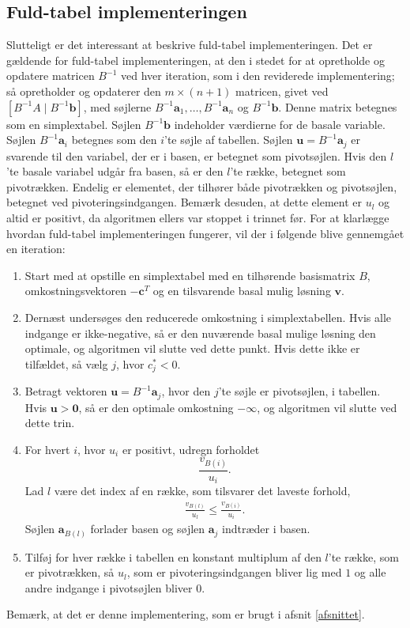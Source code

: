 \subsection{Fuld-tabel implementeringen}
Slutteligt er det interessant at beskrive fuld-tabel implementeringen. 
Det er gældende for fuld-tabel implementeringen, at den i stedet for at opretholde og opdatere matricen $B^{-1}$ ved hver iteration, som i den reviderede implementering; 
så opretholder og opdaterer den $m \times (n+1)$ matricen, givet ved $\left [ B^{-1} A \mid B^{-1} \mathbf{b} \right ]$, med søjlerne $B^{-1}\mathbf{a}_1,\ldots,B^{-1}\mathbf{a}_n$ og $B^{-1}\mathbf{b}$. 
Denne matrix betegnes som en simplextabel.
Søjlen $B^{-1}\mathbf{b}$ indeholder værdierne for de basale variable.
Søjlen $B^{-1}\mathbf{a}_i$ betegnes som den $i$'te søjle af tabellen.
Søjlen $\mathbf{u} = B^{-1}\mathbf{a}_j$ er svarende til den variabel, der er i basen, er betegnet som pivotsøjlen. 
Hvis den $l$'te basale variabel udgår fra basen, så er den $l$'te række, betegnet som pivotrækken.
Endelig er elementet, der tilhører både pivotrækken og pivotsøjlen, betegnet ved pivoteringsindgangen.
Bemærk desuden, at dette element er $u_l$ og altid er positivt, da algoritmen ellers var stoppet i trinnet før. 
For at klarlægge hvordan fuld-tabel implementeringen fungerer, vil der i følgende blive gennemgået en iteration: 
%
\begin{tcolorbox}[
title=Fuld-tabel implementering,
colback		= myblue!15,
colframe	= myblue!15,
coltitle	= black,
before skip	= 20pt plus 2pt,
after skip	= 20pt plus 2pt,
fonttitle	= \bfseries]
\begin{enumerate}
\item Start med at opstille en simplextabel med en tilhørende  basismatrix $B$, omkostningsvektoren $-\textbf{c}^T$ og en tilsvarende basal mulig løsning $\mathbf{v}.$
\item Dernæst undersøges den reducerede omkostning i simplextabellen.
Hvis alle indgange er ikke-negative, så er den nuværende basal mulige løsning den optimale, og algoritmen vil slutte ved dette punkt.
Hvis dette ikke er tilfældet, så vælg $j$, hvor $c_j^* < 0$.
\item Betragt vektoren $\mathbf{u}=B^{-1}\mathbf{a}_j$, hvor den $j$'te søjle er pivotsøjlen, i tabellen.
Hvis $\mathbf{u} > \textbf{0}$, så er den optimale omkostning $-\infty$, og algoritmen vil slutte ved dette trin. 
\item For hvert $i$, hvor $u_i$ er positivt, udregn forholdet $$\frac{v_{B(i)}}{u_i}.$$ 
Lad $l$ være det index af en række, som tilsvarer det laveste forhold,
\begin{align*}
\frac{v_{B(l)}}{u_l} \leq \frac{v_{B(i)}}{u_i}.
\end{align*}
Søjlen $\mathbf{a}_{B(l)}$ forlader basen og søjlen $\mathbf{a}_j$ indtræder i basen. 
\item Tilføj for hver række i tabellen en konstant multiplum af den $l$'te række, som er pivotrækken, så $u_l$, som er pivoteringsindgangen bliver lig med $1$ og alle andre indgange i pivotsøjlen bliver $0$. 
\end{enumerate}
\end{tcolorbox}
\noindent
%
Bemærk, at det er denne implementering, som er brugt i afsnit \ref{afsnittet}.